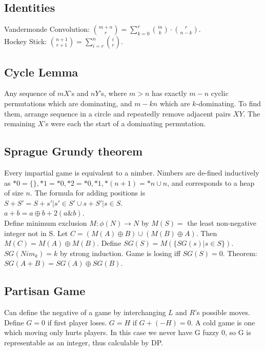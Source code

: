     \subsection{Identities}
    Vandermonde Convolution: $\binom{m+n}{r} = \sum_{k=0}^r\binom{m}{k}\cdot\binom{r}{n-k}$.\\
    Hockey Stick: $\binom{n+1}{r+1} = \sum_{i=r}^n\binom{i}{r}$.\\

    \subsection{Cycle Lemma}
    Any sequence of $m X$'s and $n Y$'s, where $m > n$ has exactly $m -n$ cyclic permutations which are dominating,
    and $m - kn$ which are $k$-dominating. To find them, arrange sequence in a circle and repeatedly remove
    adjacent pairs $XY$. The remaining $X$'s were each the start of a dominating permutation.

    \subsection{Sprague Grundy theorem}
    Every impartial game is equivalent to a nimber. Nimbers are de-fined inductively as $*0 = \{\}, *1 = {*0}, *2 = {*0, *1}, *(n+1) = *n \cup {n}$, and
    corresponds to a heap of size $n$. The formula for adding positions is $S + S' = {S + s' | s' \in S'} \cup {s + S' | s \in S}$.\\
    $a + b = a \oplus b + 2(a\&b)$.\\
    Define minimum exclusion $M : \phi(N) \rightarrow N$ by $M(S) = $ the least non-negative integer not in S.
    Let $C = (M(A) \oplus B) \cup (M(B) \oplus A)$. Then $M(C) = M(A) \oplus M(B)$.
    Define $SG(S) = M (\{SG(s) | s \in S\})$.
    $SG(Nim_k) = k$ by strong induction. Game is losing iff $SG(S) = 0$. Theorem: $SG(A + B) = SG(A) \oplus SG(B)$.

    \subsection{Partisan Game}
    Can define the negative of a game by interchanging $L$ and $R$'s possible moves.
    Define $G = 0$ if first player loses. $G = H$ if $G + (-H) = 0$.
    A cold game is one which moving only hurts players. In this case we never have G fuzzy 0, so G is
    representable as an integer, thus calculable by DP.

